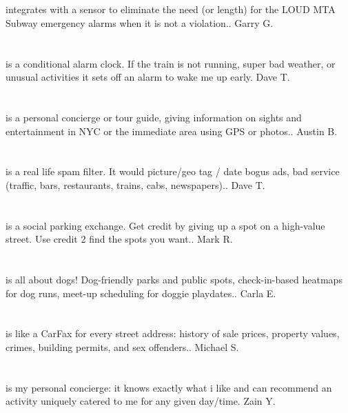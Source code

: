 \section{}integrates with a sensor to eliminate the need (or length) for the LOUD MTA Subway emergency alarms when it is not a violation.. Garry G.
\section{}is a conditional alarm clock. If the train is not running,  super bad weather,  or unusual activities it sets off an alarm to wake me up early. Dave T.
\section{}is a personal concierge or tour guide,  giving information on sights and entertainment in NYC or the immediate area using GPS or photos.. Austin B.
\section{}is a real life spam filter. It would picture/geo tag / date bogus ads,  bad service (traffic, bars, restaurants, trains, cabs, newspapers).. Dave T.
\section{}is a social parking exchange.  Get credit by giving up a spot on a high-value street.  Use credit 2 find the spots you want.. Mark R.
\section{}is all about dogs! Dog-friendly parks and public spots,  check-in-based heatmaps for dog runs,  meet-up scheduling for doggie playdates.. Carla E.
\section{}is like a CarFax for every street address: history of sale prices,  property values,  crimes,  building permits,  and sex offenders.. Michael S.
\section{}is my personal concierge: it knows exactly what i like and can recommend an activity uniquely catered to me for any given day/time. Zain Y.
